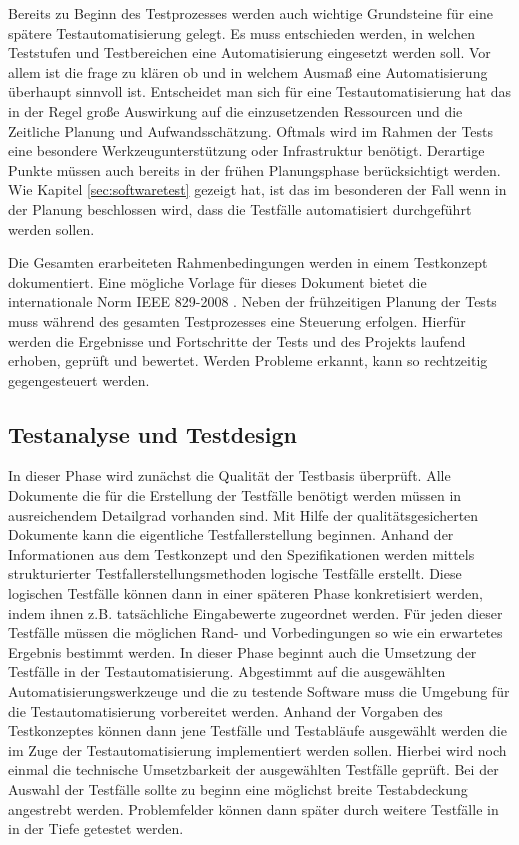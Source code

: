 Bereits zu Beginn des Testprozesses werden auch wichtige Grundsteine für eine spätere Testautomatisierung gelegt. Es muss entschieden werden, in welchen Teststufen und Testbereichen eine Automatisierung eingesetzt werden soll. Vor allem ist die frage zu klären ob und in welchem Ausmaß eine Automatisierung überhaupt sinnvoll ist.
Entscheidet man sich für eine Testautomatisierung hat das in der Regel große Auswirkung auf die einzusetzenden Ressourcen und die Zeitliche Planung und Aufwandsschätzung.
Oftmals wird im Rahmen der Tests eine besondere Werkzeugunterstützung oder Infrastruktur benötigt. Derartige Punkte müssen auch bereits in der frühen Planungsphase berücksichtigt werden. Wie Kapitel \ref{sec:softwaretest} gezeigt hat, ist das im besonderen der Fall wenn in der Planung beschlossen wird, dass die Testfälle automatisiert durchgeführt werden sollen.

Die Gesamten erarbeiteten Rahmenbedingungen werden in einem Testkonzept dokumentiert.
Eine mögliche Vorlage für dieses Dokument bietet die internationale Norm IEEE 829-2008 \cite{ieee_ieee_2008}.
Neben der frühzeitigen Planung der Tests muss während des gesamten Testprozesses eine Steuerung erfolgen.
Hierfür werden die Ergebnisse und Fortschritte der Tests und des Projekts laufend erhoben, geprüft und bewertet. Werden Probleme erkannt, kann so rechtzeitig gegengesteuert werden. 

\subsection{Testanalyse und Testdesign}
\label{subsec:testanalyse_und_design}
In dieser Phase wird zunächst die Qualität der Testbasis überprüft. Alle Dokumente die für die Erstellung der Testfälle benötigt werden müssen in ausreichendem Detailgrad vorhanden sind. Mit Hilfe der qualitätsgesicherten Dokumente kann die eigentliche Testfallerstellung beginnen.
Anhand der Informationen aus dem Testkonzept und den Spezifikationen werden mittels strukturierter Testfallerstellungsmethoden logische Testfälle erstellt. Diese logischen Testfälle können dann in einer späteren Phase konkretisiert werden, indem ihnen z.B. tatsächliche Eingabewerte zugeordnet werden. Für jeden dieser Testfälle müssen die möglichen Rand- und Vorbedingungen so wie ein erwartetes Ergebnis bestimmt werden. 
In dieser Phase beginnt auch die Umsetzung der Testfälle in der Testautomatisierung.
Abgestimmt auf die ausgewählten Automatisierungswerkzeuge und die zu testende Software  muss die Umgebung für die Testautomatisierung vorbereitet werden. Anhand der Vorgaben des Testkonzeptes können dann jene Testfälle und Testabläufe ausgewählt werden die im Zuge der Testautomatisierung implementiert werden sollen. Hierbei wird noch einmal die technische Umsetzbarkeit der ausgewählten Testfälle geprüft. Bei der Auswahl der Testfälle sollte zu beginn eine möglichst breite Testabdeckung angestrebt werden.
Problemfelder können dann später durch weitere Testfälle in in der Tiefe getestet werden.

